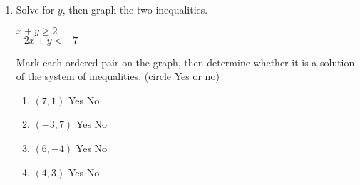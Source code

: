 \documentclass[12pt, twoside]{article}
\begin{document}
\begin{enumerate}
\newpage
\item Solve for $y$, then graph the two inequalities.

  \begin{multicols}{2}
    $x+y \geq 2$ \\
    $-2x+y < -7$
  \end{multicols}
  \vspace{3cm}

  \begin{center} %
  \end{center}
  Mark each ordered pair on the graph, then determine whether it is a solution of the system of inequalities. (circle Yes or no)
  \begin{multicols}{2}
    \raggedcolumns
    \begin{enumerate}
      \item $(7,1)$ \hspace{0.4cm} Yes \hspace{0.4cm} No
      \item $(-3,7)$ \hspace{0.4cm} Yes \hspace{0.4cm} No
      \item $(6,-4)$ \hspace{0.4cm} Yes \hspace{0.4cm} No
      \item $(4,3)$ \hspace{0.4cm} Yes \hspace{0.4cm} No
    \end{enumerate}
  \end{multicols}


\end{enumerate}
\newpage
\end{document}
